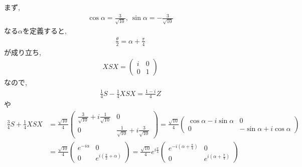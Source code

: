 \begin{ex}

    \label{ex4.41}
    まず,
    \begin{align*}
        \cos \alpha = \frac{3}{\sqrt{10}}, \ \sin \alpha = - \frac{3}{\sqrt{10}}
    \end{align*}
    なる$\alpha$を定義すると,
    \begin{align*}
        \frac{\theta}{2 } = \alpha + \frac{\pi}{4}
    \end{align*}
    が成り立ち,
    \begin{align*}
        XSX =
        \begin{pmatrix}
            i & 0 \\
            0 & 1
        \end{pmatrix}
    \end{align*}
    なので,
    \begin{align*}
        \frac{1}{4}S - \frac{1}{4}XSX = \frac{1-i}{4} Z
    \end{align*}
    や
    \begin{align*}
        \frac{3}{4}S +\frac{1}{4} XSX
         & =
        \frac{\sqrt{10}}{4}
        \begin{pmatrix}
            \frac{3}{\sqrt{10}} + i\frac{1}{\sqrt{10}} & 0                                          \\
            0                                          & \frac{1}{\sqrt{10}} + i\frac{3}{\sqrt{10}}
        \end{pmatrix}
        =
        \frac{\sqrt{10}}{4}
        \begin{pmatrix}
            \cos \alpha - i \sin \alpha & 0                            \\
            0                           & - \sin\alpha + i \cos \alpha
        \end{pmatrix}
        \\
         & =
        \frac{\sqrt{10}}{4}
        \begin{pmatrix}
            e^{ - i \alpha} & 0                               \\
            0               & e^{i ( \frac{\pi}{2} + \alpha)}
        \end{pmatrix}
        =
        \frac{\sqrt{10}}{4} e^{i \frac{\pi}{4}}
        \begin{pmatrix}
            e^{- i ( \alpha + \frac{\pi}{4})} & 0                              \\
            0                                 & e^{i (\alpha + \frac{\pi}{4})}

\end{pmatrix}
\end{align*}
\end{ex}
